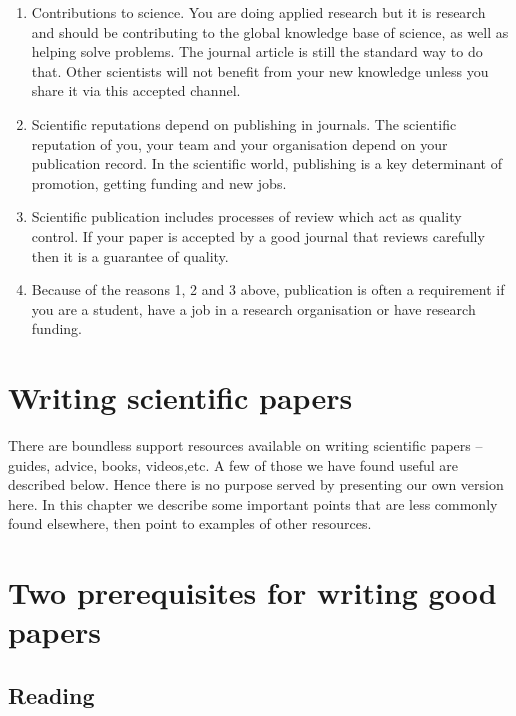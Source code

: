 \documentclass[
  titlepage]{book}
\begin{document}
\begin{enumerate}
\def\labelenumi{\arabic{enumi}.}
\item
  Contributions to science. You are doing applied research but it is research and should be contributing to the global knowledge base of science, as well as helping solve problems. The journal article is still the standard way to do that. Other scientists will not benefit from your new knowledge unless you share it via this accepted channel.
\item
  Scientific reputations depend on publishing in journals. The scientific reputation of you, your team and your organisation depend on your publication record. In the scientific world, publishing is a key determinant of promotion, getting funding and new jobs.
\item
  Scientific publication includes processes of review which act as quality control. If your paper is accepted by a good journal that reviews carefully then it is a guarantee of quality.
\item
  Because of the reasons 1, 2 and 3 above, publication is often a requirement if you are a student, have a job in a research organisation or have research funding.
\end{enumerate}

\hypertarget{writing-scientific-papers}{%
\section{Writing scientific papers}\label{writing-scientific-papers}}

There are boundless support resources available on writing scientific papers -- guides, advice, books, videos,etc. A few of those we have found useful are described below. Hence there is no purpose served by presenting our own version here. In this chapter we describe some important points that are less commonly found elsewhere, then point to examples of other resources.

\hypertarget{two-prerequisites-for-writing-good-papers}{%
\section{Two prerequisites for writing good papers}\label{two-prerequisites-for-writing-good-papers}}

\hypertarget{reading}{%
\subsection{Reading}\label{reading}}
\end{document}
